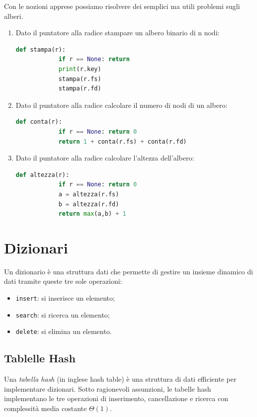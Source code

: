 Con le nozioni apprese possiamo risolvere dei semplici ma utili problemi sugli alberi.
\begin{enumerate}
    \item Dato il puntatore alla radice stampare un albero binario di n nodi:
    \begin{lstlisting}[language=Python]
        def stampa(r):
            if r == None: return
            print(r.key)
            stampa(r.fs)
            stampa(r.fd)
    \end{lstlisting}
    
    \item Dato il puntatore alla radice calcolare il numero di nodi di un albero:
    \begin{lstlisting}[language=Python]
        def conta(r):
            if r == None: return 0
            return 1 + conta(r.fs) + conta(r.fd)
    \end{lstlisting}
    
    \item Dato il puntatore alla radice calcolare l'altezza dell'albero:
    \begin{lstlisting}[language=Python]
        def altezza(r):
            if r == None: return 0
            a = altezza(r.fs)
            b = altezza(r.fd)
            return max(a,b) + 1
    \end{lstlisting}
\end{enumerate}


\chapter{Dizionari}
Un dizionario è una struttura dati che permette di gestire un insieme dinamico di dati tramite queste tre sole operazioni:
\begin{itemize}
    \item \verb|insert|: si inserisce un elemento;
    \item \verb|search|: si ricerca un elemento;
    \item \verb|delete|: si elimina un elemento.
\end{itemize}

\section{Tablelle Hash}
Una \textit{tabella hash} (in inglese hash table) è una struttura di dati efficiente per implementare dizionari. Sotto ragionevoli assunzioni, le tabelle hash implementano le tre operazioni di inserimento, cancellazione e ricerca con complessità media costante $\Theta(1)$.

